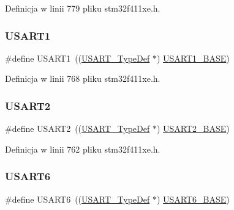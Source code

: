 Definicja w linii 779 pliku stm32f411xe.\+h.

\mbox{\label{group___peripheral__declaration_ga92871691058ff7ccffd7635930cb08da}} 
\subsubsection{\texorpdfstring{U\+S\+A\+R\+T1}{USART1}}
{\footnotesize\ttfamily \#define U\+S\+A\+R\+T1~((\hyperlink{struct_u_s_a_r_t___type_def}{U\+S\+A\+R\+T\+\_\+\+Type\+Def} $\ast$) \hyperlink{group___peripheral__memory__map_ga86162ab3f740db9026c1320d46938b4d}{U\+S\+A\+R\+T1\+\_\+\+B\+A\+SE})}



Definicja w linii 768 pliku stm32f411xe.\+h.

\mbox{\label{group___peripheral__declaration_gaf114a9eab03ca08a6fb720e511595930}} 
\subsubsection{\texorpdfstring{U\+S\+A\+R\+T2}{USART2}}
{\footnotesize\ttfamily \#define U\+S\+A\+R\+T2~((\hyperlink{struct_u_s_a_r_t___type_def}{U\+S\+A\+R\+T\+\_\+\+Type\+Def} $\ast$) \hyperlink{group___peripheral__memory__map_gade83162a04bca0b15b39018a8e8ec090}{U\+S\+A\+R\+T2\+\_\+\+B\+A\+SE})}



Definicja w linii 762 pliku stm32f411xe.\+h.

\mbox{\label{group___peripheral__declaration_ga2dab39a19ce3dd05fe360dcbb7b5dc84}} 
\subsubsection{\texorpdfstring{U\+S\+A\+R\+T6}{USART6}}
{\footnotesize\ttfamily \#define U\+S\+A\+R\+T6~((\hyperlink{struct_u_s_a_r_t___type_def}{U\+S\+A\+R\+T\+\_\+\+Type\+Def} $\ast$) \hyperlink{group___peripheral__memory__map_gade4d3907fd0387ee832f426f52d568bb}{U\+S\+A\+R\+T6\+\_\+\+B\+A\+SE})}



